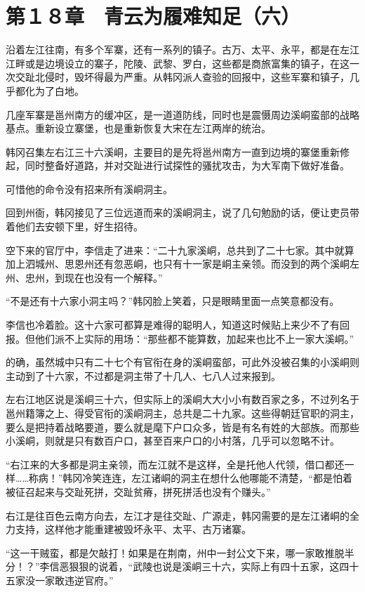 \section{第１８章　青云为履难知足（六）}

沿着左江往南，有多个军寨，还有一系列的镇子。古万、太平、永平，都是在左江江畔或是边境设立的寨子，陀陵、武黎、罗白，这些都是商旅富集的镇子，在这一次交趾北侵时，毁坏得最为严重。从韩冈派人查验的回报中，这些军寨和镇子，几乎都化为了白地。

几座军寨是邕州南方的缓冲区，是一道道防线，同时也是震慑周边溪峒蛮部的战略基点。重新设立寨堡，也是重新恢复大宋在左江两岸的统治。

韩冈召集左右江三十六溪峒，主要目的是先将邕州南方一直到边境的寨堡重新修起，同时整备好道路，并对交趾进行试探性的骚扰攻击，为大军南下做好准备。

可惜他的命令没有招来所有溪峒洞主。

回到州衙，韩冈接见了三位远道而来的溪峒洞主，说了几句勉励的话，便让吏员带着他们去安顿下里，好生招待。

空下来的官厅中，李信走了进来：“二十九家溪峒，总共到了二十七家。其中就算加上泗城州、思恩州还有忽恶峒，也只有十一家是峒主亲领。而没到的两个溪峒左州、忠州，到现在也没有一个解释。”

“不是还有十六家小洞主吗？”韩冈脸上笑着，只是眼睛里面一点笑意都没有。

李信也冷着脸。这十六家可都算是难得的聪明人，知道这时候贴上来少不了有回报。但他们派不上实际的用场：“那些都不能算数，加起来也比不上一家大溪峒。”

的确，虽然城中只有二十七个有官衔在身的溪峒蛮部，可此外没被召集的小溪峒则主动到了十六家，不过都是洞主带了十几人、七八人过来报到。

左右江地区说是溪峒三十六，但实际上的溪峒大大小小有数百家之多，不过列名于邕州籍簿之上、得受官衔的溪峒洞主，总共是二十九家。这些得朝廷官职的洞主，要么是把持着战略要道，要么就是麾下户口众多，皆是有名有姓的大部族。而那些小溪峒，则就是只有数百户口，甚至百来户口的小村落，几乎可以忽略不计。

“右江来的大多都是洞主亲领，而左江就不是这样，全是托他人代领，借口都还一样……称病！”韩冈冷笑连连，左江诸峒的洞主在想什么他哪能不清楚，“都是怕着被征召起来与交趾死拼，交趾贫瘠，拼死拼活也没有个赚头。”

右江是往百色云南方向去，左江才是往交趾、广源走，韩冈需要的是左江诸峒的全力支持，这样他才能重建被毁坏永平、太平、古万诸寨。

“这一干贼蛮，都是欠敲打！如果是在荆南，州中一封公文下来，哪一家敢推脱半分！？”李信恶狠狠的说着，“武陵也说是溪峒三十六，实际上有四十五家，这四十五家没一家敢违逆官府。”

